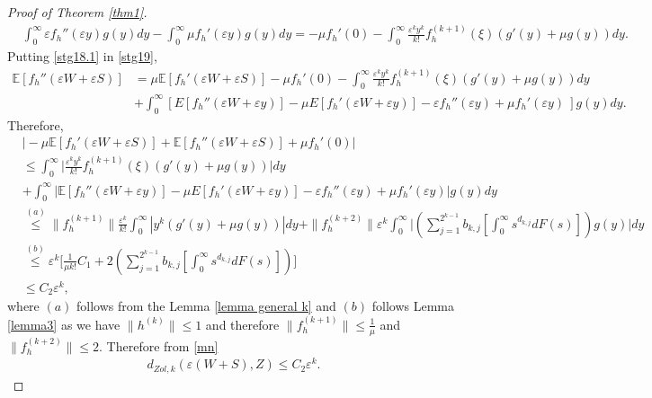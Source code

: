 \documentclass[11pt,letterpaper,reqno]{article}
\theoremstyle{thmstyleone}%
\theoremstyle{thmstyletwo}%
\theoremstyle{thmstylethree}%
\numberwithin{equation}{section}
\begin{document}
\begin{proof}[Proof of Theorem \ref{thm1}]
\begin{align}\label{stg18.1}
   & \int_0^\infty\varepsilon f_h''(\varepsilon y)g(y)dy-\int_0^\infty \mu f_h'(\varepsilon y)g(y)dy =-\mu f_h'(0) -\int_0^\infty \frac{\varepsilon^k y^k}{k!}f_h^{(k+1)}(\xi)(g'(y)+\mu g(y))dy .
\end{align}
Putting \eqref{stg18.1} in \eqref{stg19},
\begin{align*}
    \mathbb E[f_h''(\varepsilon W+\varepsilon S)]&=\mu \mathbb E[f_h'(\varepsilon W+\varepsilon S)]-\mu f_h'(0) -\int_0^\infty \frac{\varepsilon^k y^k}{k!}f_h^{(k+1)}(\xi)(g'(y)+\mu g(y))dy \\
  &+\int_0^\infty \left[E[f_h''(\varepsilon W+\varepsilon y)]-\mu E[f_h'(\varepsilon W+\varepsilon y)]-\varepsilon f_h''(\varepsilon y)
     +\mu f_h'(\varepsilon y)\ \right] g(y)dy.
\end{align*}
Therefore,
\begin{align*}
    &\bigg|-\mu \mathbb E[f_h'(\varepsilon W+\varepsilon S)]+ \mathbb E[f_h''(\varepsilon W+\varepsilon S)]+\mu f_h'(0)\bigg|\\
    &\leq \int_0^\infty \bigg|\frac{\varepsilon^ky^k}{k!}f_h^{(k+1)}(\xi) (g'(y)+\mu g(y)) \bigg|dy\\
    &+\int_0^\infty\bigg|\mathbb E[f_h''(\varepsilon W+\varepsilon y)]-\mu E[f_h'(\varepsilon W+\varepsilon y)]-\varepsilon f_h''(\varepsilon y)
     +\mu f_h'(\varepsilon y)\bigg| g(y)dy\\
    &\stackrel{(a)} {\leq} \|f_h^{(k+1)}\|\frac{\varepsilon^k}{k!}\int_0^\infty|y^k(g'(y)+\mu g(y))|dy+\|f_h^{(k+2)}\| \varepsilon^k\int_0^\infty \bigg|\left( \sum_{j=1}^{2^{k-1}}b_{k,j}   \left[ \int_0^\infty s^{d_{k,j}} dF(s)\right]\right) g(y) \bigg|dy\\
    &\stackrel{(b)}{\leq}  \varepsilon^k \bigg[\frac{1}{\mu k!}C_1+2  \left( \sum_{j=1}^{2^{k-1}}b_{k,j}   \left[ \int_0^\infty s^{d_{k,j}} dF(s)\right]\right) \bigg]\\
    &\leq C_2 \varepsilon^k,
\end{align*}
where  $(a)$ follows from the Lemma \ref{lemma general k} and $(b)$ follows Lemma \ref{lemma3} as we have $\|h^{(k)}\| \leq 1 $ and therefore $\|f_h^{(k+1)}\| \leq \frac{1}{\mu}$ and $\|f_h^{(k+2)}\| \leq 2$. Therefore from \eqref{mn}
\begin{align*}
    d_{Zol,k}(\varepsilon(W+S),Z)\leq C_2\varepsilon^k.
\end{align*}
\end{proof}
\end{document}
